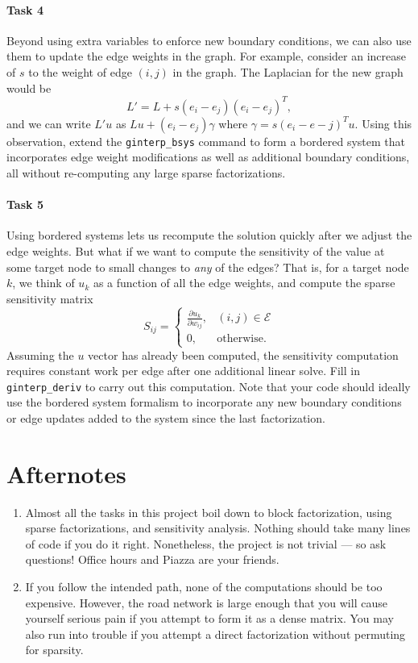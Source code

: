 \documentclass[12pt, leqno]{article}
\begin{document}
\paragraph*{Task 4}
Beyond using extra variables to enforce new boundary conditions, we
can also use them to update the edge weights in the graph.  For
example, consider an increase of $s$ to the weight of edge $(i,j)$
in the graph.  The Laplacian for the new graph would be
\[
  L' = L + s (e_i-e_j) (e_i-e_j)^T,
\]
and we can write $L'u$ as $Lu + (e_i-e_j) \gamma$ where
$\gamma = s (e_i-e-j)^T u$.  Using this observation, extend the
{\tt ginterp\_bsys} command to form a bordered system that incorporates
edge weight modifications as well as additional boundary conditions,
all without re-computing any large sparse factorizations.

\paragraph*{Task 5}
Using bordered systems lets us recompute the solution quickly after we
adjust the edge weights.  But what if we want to compute the sensitivity
of the value at some target node to small changes to {\em any} of the
edges?  That is, for a target node $k$, we think of $u_k$ as a function
of all the edge weights, and compute the sparse sensitivity matrix
\[
  S_{ij} =
  \begin{cases}
    \frac{\partial u_k}{\partial w_{ij}}, & (i,j) \in \mathcal{E} \\
    0, & \mbox{otherwise}.
  \end{cases}
\]
Assuming the $u$ vector has already been computed, the sensitivity
computation requires constant work per edge after one additional
linear solve.  Fill in {\tt ginterp\_deriv} to carry out this
computation.  Note that your code should ideally use the bordered
system formalism to incorporate any new boundary conditions or
edge updates added to the system since the last factorization.

\section*{Afternotes}

\begin{enumerate}
\item Almost all the tasks in this project boil down to block factorization,
  using sparse factorizations, and sensitivity analysis.  Nothing should take
  many lines of code if you do it right.  Nonetheless, the project is
  not trivial --- so ask questions!  Office hours and Piazza are your friends.
\item If you follow the intended path, none of the computations should
  be too expensive.  However, the road network is large enough that
  you will cause yourself serious pain if you attempt to form it as a
  dense matrix.  You may also run into trouble if you attempt a direct
  factorization without permuting for sparsity.
\end{enumerate}
\end{document}
